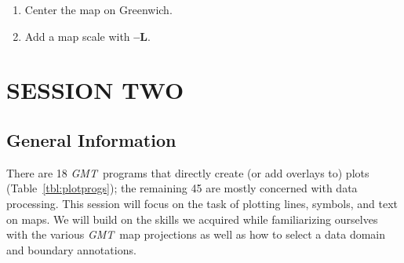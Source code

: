 \documentclass{report}
\newcommand{\GMT}{\textit{GMT}}%
\newcommand{\GMT}{\htmladdnormallink{\texttt{[image: eps/GMT\_glyph10.eps]}}{http://gmt.soest.hawaii.edu}}%
\newcommand{\Opt}[1]{{\bf --#1}}%
\newcommand{\GMT}{\htmladdnormallink{\textbf{GMT}}{http://gmt.soest.hawaii.edu}}%
\newcommand{\Opt}[1]{{\bf -#1}}%
\begin{document}
\begin{enumerate}

\item Center the map on Greenwich.

\item Add a map scale with \Opt{L}.

\end{enumerate}

\chapter{SESSION TWO} 
\thispagestyle{headings}

\section{General Information}

There are 18 \GMT\ programs that directly create (or add overlays to)
plots (Table~\ref{tbl:plotprogs}); the remaining 45 are mostly concerned with data
processing.  This session will focus on the task of plotting
lines, symbols, and text on maps.  We will build on the skills
we acquired while familiarizing ourselves with the various
\GMT\ map projections as well as how to select a data domain
and boundary annotations.
\end{document}
